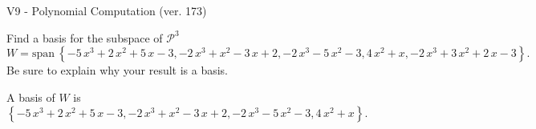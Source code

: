 \begin{exercise}
  \begin{exerciseTitle}V9 - Polynomial Computation (ver. 173)\end{exerciseTitle}
  \begin{exerciseStatement}
    Find a basis for the subspace of \(\mathcal{P}^3\) 
\[W=\mathrm{span}\ \left\{-5 \, x^{3} + 2 \, x^{2} + 5 \, x - 3 , -2 \, x^{3} + x^{2} - 3 \, x + 2 , -2 \, x^{3} - 5 \, x^{2} - 3 , 4 \, x^{2} + x , -2 \, x^{3} + 3 \, x^{2} + 2 \, x - 3\right\}.\]
 Be sure to explain why your result is a basis.


  \end{exerciseStatement}
  \begin{exerciseAnswer}
   A basis of \(W\) is  \(\left\{-5 \, x^{3} + 2 \, x^{2} + 5 \, x - 3 , -2 \, x^{3} + x^{2} - 3 \, x + 2 , -2 \, x^{3} - 5 \, x^{2} - 3 , 4 \, x^{2} + x\right\}\).
  


  \end{exerciseAnswer}
\end{exercise}